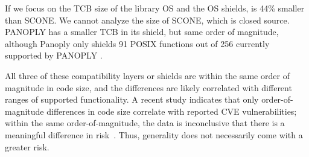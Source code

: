 If we focus on the TCB size of the library OS and the OS shields, 
\graphenesgx{} is 
44\% smaller than SCONE{}. 
We cannot analyze the size of SCONE{}, which is closed source.
PANOPLY has a smaller TCB in its shield, but same order of magnitude, although Panoply only shields 91 POSIX functions out of 256 currently supported by PANOPLY .

All three of these compatibility layers or shields are within the same
order of magnitude in code size, and the differences are likely 
correlated with different ranges of supported functionality.
A recent study indicates that only order-of-magnitude differences in code
size correlate with reported CVE vulnerabilities; within the same order-of-magnitude,
the data is inconclusive that there is a meaningful difference in risk~\cite{security-metric}.
Thus, generality does not necessarily come with 
a greater risk. %



